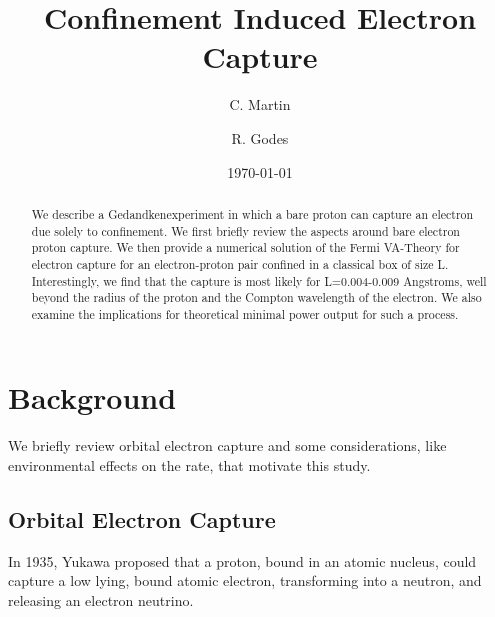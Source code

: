 \documentclass[%
 aip,
 jmp,%
 amsmath,amssymb,
 reprint,%
]{revtex4-1}
\begin{document}

\title[]{Confinement Induced Electron Capture}

\author{C. Martin}
\author{R. Godes}%
%


\date{\today}%

\begin{abstract}
We describe a Gedandkenexperiment in which a bare proton can capture an electron due solely to confinement. We first briefly review the aspects around bare electron proton capture.  We then provide a numerical solution of the Fermi VA-Theory for electron capture for an electron-proton pair confined in a classical box of size L. Interestingly, we find that the capture is most likely for L=0.004-0.009 Angstroms, well beyond the radius of the proton and the Compton wavelength of the electron.  We also examine the implications for theoretical minimal power output for such a process.
%
\end{abstract}

\maketitle

\section{Background}

We briefly review orbital electron capture and some considerations, like environmental effects on the rate, that motivate this study.

\subsection{Orbital Electron Capture}
In 1935, Yukawa proposed that a proton, bound in an atomic nucleus,  could capture a low lying, bound atomic electron, transforming into a neutron, and releasing an electron neutrino.
\end{document}
